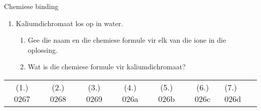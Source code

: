 \begin{eocexercises}{Chemiese binding}
\begin{enumerate}[noitemsep, label=\textbf{\arabic*}. ]
              \label{m38689*uid185}\item Kaliumdichromaat los op in water.
\label{m38689*id148361}\begin{enumerate}[noitemsep, label=\textbf{\alph*}. ] 
            \label{m38689*uid186}\item Gee die naam en die chemiese formule vir elk van die ione in die oplossing.
\label{m38689*uid187}\item Wat is die chemiese formule vir kaliumdichromaat?
\end{enumerate}
                \end{enumerate}

\practiceinfo
\begin{tabular}[h]{cccccc}
 (1.) 0267  &  (2.) 0268  &  (3.) 0269  &  (4.) 026a  &  (5.) 026b  &  (6.) 026c  &  (7.) 026d  &
\end{tabular}
\end{eocexercises}
